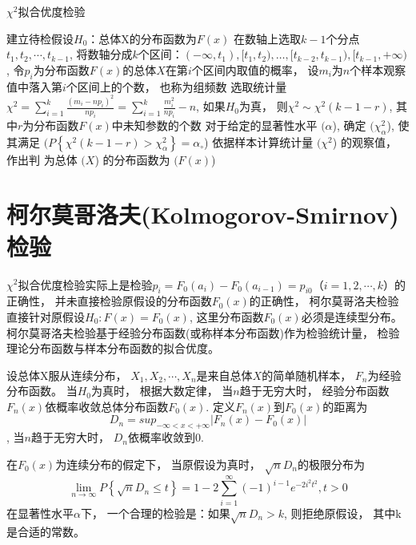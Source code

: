 \begin{algorithm}
\caption{$\chi^2$拟合优度检验}
建立待检假设$H_0$：总体X的分布函数为$F(x)$\;
在数轴上选取$k-1$个分点$t_1,t_2,\cdots,t_{k-1}$, 将数轴分成$k$个区间：$(-\infty,t_1), [t_1,t_2), …, [t_{k-2},t_{k-1}), [t_{k-1},+\infty)$, 令$p_i$为分布函数$F(x)$的总体$X$在第$i$个区间内取值的概率， 设$m_i$为$n$个样本观察值中落入第$i$个区间上的个数， 也称为组频数\;
选取统计量$\chi^2=\sum_{i=1}^{k}\frac{(m_i-np_i)^2}{np_i}=\sum_{i=1}^{k}{\frac{m_i^2}{np_i}-n}$, 如果$H_0$为真， 则$\chi^2 \sim \chi^2(k-1-r)$, 其中$r$为分布函数$F(x)$中未知参数的个数\;
对于给定的显著性水平 $( \alpha $), 确定 $( \chi_{\alpha}^{2} $), 使其满足 $( P\left\{\chi^{2}(k-1-r)>\chi_{\alpha}^{2}\right\}=\alpha_{\circ} $) \;
依据样本计算统计量 $( \chi^{2} $) 的观察值， 作出判
为总体 $( X $) 的分布函数为 $( F(x) $) \;
\end{algorithm}

\section{柯尔莫哥洛夫(Kolmogorov-Smirnov)检验}

$\chi^2$拟合优度检验实际上是检验$p_i=F_0(a_i)-F_0(a_{i-1})=p_{i0}（i=1,2,\cdots,k）$的正确性， 并未直接检验原假设的分布函数$F_0(x)$的正确性， 柯尔莫哥洛夫检验直接针对原假设$H_0:F(x)=F_0(x)$, 这里分布函数$F_0(x)$必须是连续型分布。 柯尔莫哥洛夫检验基于经验分布函数(或称样本分布函数)作为检验统计量， 检验理论分布函数与样本分布函数的拟合优度。 

设总体X服从连续分布， $X_1,X_2,\cdots,X_n$是来自总体$X$的简单随机样本， $F_n$为经验分布函数。 当$H_0$为真时， 根据大数定律， 当$n$趋于无穷大时， 经验分布函数$F_n(x)$依概率收敛总体分布函数$F_0(x)$. 定义$F_n(x)$到$F_0(x)$的距离为
\begin{equation}D_n={sup}_{-\infty<x<+\infty}\left|F_n(x)-F_0(x)\right|\end{equation}, 
当$n$趋于无穷大时， $D_n$依概率收敛到$0$. 

\begin{theorem}[Kolmogorov定理]  
    在$F_0(x)$为连续分布的假定下， 当原假设为真时， $\sqrt n D_n$的极限分布为
\begin{equation} \lim _{n \rightarrow \infty} P\left\{\sqrt{n} D_{n} \leq t\right\}=1-2 \sum_{i=1}^{\infty}(-1)^{i-1} e^{-2 i^{2} t^{2}}, t>0 \end{equation}  
在显著性水平$\alpha$下， 一个合理的检验是：如果$\sqrt n D_n>k$, 则拒绝原假设， 其中k是合适的常数。    
\end{theorem}

